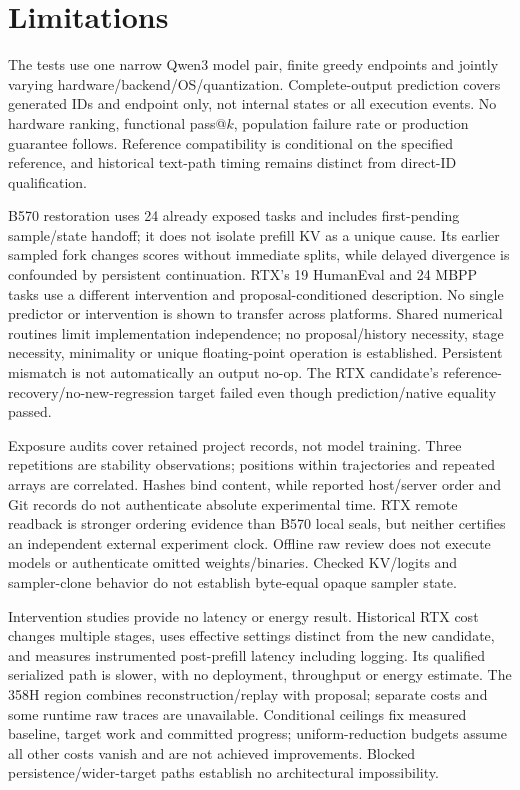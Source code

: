 \section{Limitations}
\label{sec:limitations}
The tests use one narrow Qwen3 model pair, finite greedy endpoints and jointly varying hardware/backend/OS/quantization. Complete-output prediction covers generated IDs and endpoint only, not internal states or all execution events. No hardware ranking, functional pass@$k$, population failure rate or production guarantee follows. Reference compatibility is conditional on the specified reference, and historical text-path timing remains distinct from direct-ID qualification.

B570 restoration uses 24 already exposed tasks and includes first-pending sample/state handoff; it does not isolate prefill KV as a unique cause. Its earlier sampled fork changes scores without immediate splits, while delayed divergence is confounded by persistent continuation. RTX's 19 HumanEval and 24 MBPP tasks use a different intervention and proposal-conditioned description. No single predictor or intervention is shown to transfer across platforms. Shared numerical routines limit implementation independence; no proposal/history necessity, stage necessity, minimality or unique floating-point operation is established. Persistent mismatch is not automatically an output no-op. The RTX candidate's reference-recovery/no-new-regression target failed even though prediction/native equality passed.

Exposure audits cover retained project records, not model training. Three repetitions are stability observations; positions within trajectories and repeated arrays are correlated. Hashes bind content, while reported host/server order and Git records do not authenticate absolute experimental time. RTX remote readback is stronger ordering evidence than B570 local seals, but neither certifies an independent external experiment clock. Offline raw review does not execute models or authenticate omitted weights/binaries. Checked KV/logits and sampler-clone behavior do not establish byte-equal opaque sampler state.

Intervention studies provide no latency or energy result. Historical RTX cost changes multiple stages, uses effective settings distinct from the new candidate, and measures instrumented post-prefill latency including logging. Its qualified serialized path is slower, with no deployment, throughput or energy estimate. The 358H region combines reconstruction/replay with proposal; separate costs and some runtime raw traces are unavailable. Conditional ceilings fix measured baseline, target work and committed progress; uniform-reduction budgets assume all other costs vanish and are not achieved improvements. Blocked persistence/wider-target paths establish no architectural impossibility.

